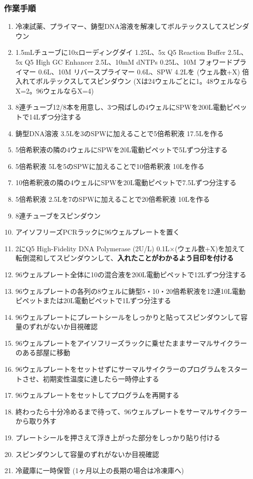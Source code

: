\documentclass[titlepage,10pt,a4paper,uplatex]{jsbook}
\renewcommand{\textbf}[1]{{\bfseries\sffamily#1}}
\begin{document}
\subsubsection{作業手順}
\begin{enumerate}
\item 冷凍試薬、プライマー、鋳型DNA溶液を解凍してボルテックスしてスピンダウン
\item 1.5mLチューブに10xローディングダイ 1.25{\textmu}L、5x Q5 Reaction Buffer 2.5{\textmu}L、5x Q5 High GC Enhancer 2.5{\textmu}L、10mM dNTPs 0.25{\textmu}L、10{\textmu}M フォワードプライマー 0.6{\textmu}L、10{\textmu}M リバースプライマー 0.6{\textmu}L、SPW 4.2{\textmu}Lを (ウェル数+X) 倍入れてボルテックスしてスピンダウン (Xは24ウェルごとに1。48ウェルならX=2。96ウェルならX=4)
\item 8連チューブ12/8本を用意し、3つ飛ばしの4ウェルにSPWを200{\textmu}L電動ピペットで14{\textmu}Lずつ分注する
\item 鋳型DNA溶液 3.5{\textmu}Lを3のSPWに加えることで5倍希釈液 17.5{\textmu}Lを作る
\item 5倍希釈液の隣の4ウェルにSPWを20{\textmu}L電動ピペットで5{\textmu}Lずつ分注する
\item 5倍希釈液 5{\textmu}Lを5のSPWに加えることで10倍希釈液 10{\textmu}Lを作る
\item 10倍希釈液の隣の4ウェルにSPWを20{\textmu}L電動ピペットで7.5{\textmu}Lずつ分注する
\item 5倍希釈液 2.5{\textmu}Lを7のSPWに加えることで20倍希釈液 10{\textmu}Lを作る
\item 8連チューブをスピンダウン
\item アイソフリーズPCRラックに96ウェルプレートを置く
\item 2にQ5 High-Fidelity DNA Polymerase (2U/{\textmu}L) 0.1{\textmu}L×(ウェル数+X)を加えて転倒混和してスピンダウンして、\textbf{入れたことがわかるよう目印を付ける}
\item 96ウェルプレート全体に10の混合液を200{\textmu}L電動ピペットで12{\textmu}Lずつ分注する
\item 96ウェルプレートの各列の8ウェルに鋳型5・10・20倍希釈液を12連10{\textmu}L電動ピペットまたは20{\textmu}L電動ピペットで1{\textmu}Lずつ分注する
\item 96ウェルプレートにプレートシールをしっかりと貼ってスピンダウンして容量のずれがないか目視確認
\item 96ウェルプレートをアイソフリーズラックに乗せたままサーマルサイクラーのある部屋に移動
\item 96ウェルプレートをセットせずにサーマルサイクラーのプログラムをスタートさせ、初期変性温度に達したら一時停止する
\item 96ウェルプレートをセットしてプログラムを再開する
\item 終わったら十分冷めるまで待って、96ウェルプレートをサーマルサイクラーから取り外す
\item プレートシールを押さえて浮き上がった部分をしっかり貼り付ける
\item スピンダウンして容量のずれがないか目視確認
\item 冷蔵庫に一時保管 (1ヶ月以上の長期の場合は冷凍庫へ)
\end{enumerate}
\end{document}
